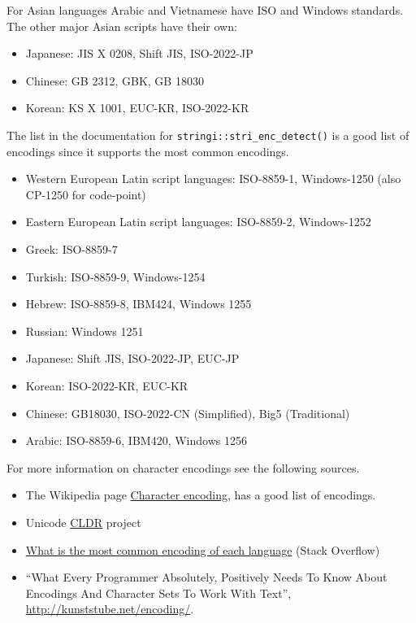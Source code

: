 \documentclass[]{book}
\providecommand{\tightlist}{%
  \setlength{\itemsep}{0pt}\setlength{\parskip}{0pt}}
\theoremstyle{plain}
\theoremstyle{remark}
\begin{document}
For Asian languages Arabic and Vietnamese have ISO and Windows standards. The other major Asian scripts have their own:

\begin{itemize}
\tightlist
\item
  Japanese: JIS X 0208, Shift JIS, ISO-2022-JP
\item
  Chinese: GB 2312, GBK, GB 18030
\item
  Korean: KS X 1001, EUC-KR, ISO-2022-KR
\end{itemize}

The list in the documentation for \texttt{stringi::stri\_enc\_detect()} is a good list of encodings since it supports the most common encodings.

\begin{itemize}
\tightlist
\item
  Western European Latin script languages: ISO-8859-1, Windows-1250 (also CP-1250 for code-point)
\item
  Eastern European Latin script languages: ISO-8859-2, Windows-1252
\item
  Greek: ISO-8859-7
\item
  Turkish: ISO-8859-9, Windows-1254
\item
  Hebrew: ISO-8859-8, IBM424, Windows 1255
\item
  Russian: Windows 1251
\item
  Japanese: Shift JIS, ISO-2022-JP, EUC-JP
\item
  Korean: ISO-2022-KR, EUC-KR
\item
  Chinese: GB18030, ISO-2022-CN (Simplified), Big5 (Traditional)
\item
  Arabic: ISO-8859-6, IBM420, Windows 1256
\end{itemize}

For more information on character encodings see the following sources.

\begin{itemize}
\tightlist
\item
  The Wikipedia page \href{https://en.wikipedia.org/wiki/Character_encoding}{Character encoding}, has a good list of encodings.
\item
  Unicode \href{http://cldr.unicode.org/}{CLDR} project
\item
  \href{https://stackoverflow.com/questions/8509339/what-is-the-most-common-encoding-of-each-language}{What is the most common encoding of each language} (Stack Overflow)
\item
  ``What Every Programmer Absolutely, Positively Needs To Know About Encodings And Character Sets To Work With Text'', \url{http://kunststube.net/encoding/}.
\end{itemize}
\end{document}
